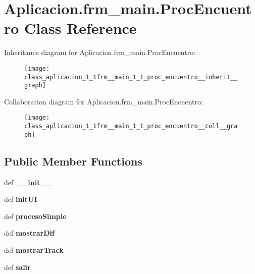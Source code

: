 \section{\-Aplicacion.\-frm\-\_\-main.\-Proc\-Encuentro \-Class \-Reference}
\label{class_aplicacion_1_1frm__main_1_1_proc_encuentro}


\-Inheritance diagram for \-Aplicacion.\-frm\-\_\-main.\-Proc\-Encuentro\-:\nopagebreak
\begin{figure}[H]
\begin{center}
\leavevmode
\texttt{[image: class\_aplicacion\_1\_1frm\_\_main\_1\_1\_proc\_encuentro\_\_inherit\_\_graph]}
\end{center}
\end{figure}


\-Collaboration diagram for \-Aplicacion.\-frm\-\_\-main.\-Proc\-Encuentro\-:\nopagebreak
\begin{figure}[H]
\begin{center}
\leavevmode
\texttt{[image: class\_aplicacion\_1\_1frm\_\_main\_1\_1\_proc\_encuentro\_\_coll\_\_graph]}
\end{center}
\end{figure}
\subsection*{\-Public \-Member \-Functions}
\begin{DoxyCompactItemize}
\item 
def {\bf \-\_\-\-\_\-init\-\_\-\-\_\-}
\item 
def {\bf init\-U\-I}
\item 
def {\bf proceso\-Simple}
\item 
def {\bf mostrar\-Dif}
\item 
def {\bf mostrar\-Track}
\item 
def {\bf salir}
\end{DoxyCompactItemize}
